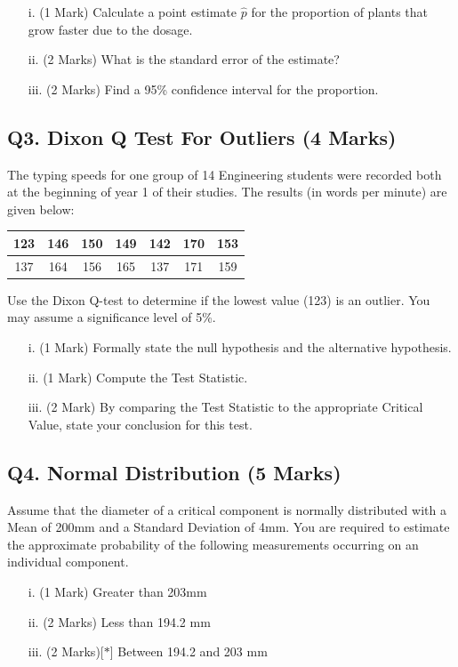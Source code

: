 \documentclass[a4paper,12pt]{article}
\begin{document}
\begin{itemize}
	\item[i.] (1 Mark) Calculate a point estimate $\hat{p}$ for the proportion of plants that grow faster due to the dosage. 									 
	\item[ii.] (2 Marks)  What is the standard error of the estimate? 			
	\item[iii.] (2 Marks) Find a 95\% confidence interval for the proportion. 					
\end{itemize}


\subsection*{Q3. Dixon Q Test For Outliers (4 Marks)}

The typing speeds for one group of 14 Engineering students were recorded both at the beginning of year 1 of their studies. The results (in words per minute) are given below:

\begin{center}
	\begin{tabular}{|c|c|c|c|c|c|c|}
		\hline
		123 & 146 & 150 &149 &142 &170& 153\\ \hline
		137 & 164 & 156& 165& 137& 171& 159
		\\ \hline
	\end{tabular}
\end{center}
Use the Dixon Q-test to determine if the lowest value (123) is an outlier. You may assume a significance level of 5\%.

\begin{itemize}
	\item[i.] (1 Mark) Formally state the null hypothesis and the alternative hypothesis.
	\item[ii.] (1 Mark) Compute the Test Statistic.
	\item[iii.] (2 Mark) By comparing the Test Statistic to the appropriate Critical Value, state your conclusion for this test.
\end{itemize}
\newpage
\subsection*{Q4. Normal Distribution (5 Marks)} %
Assume that the diameter of a critical component is normally distributed with a Mean of 200mm and a Standard Deviation of 4mm. You are required  to estimate the approximate probability of the following measurements occurring on an individual component.
\begin{itemize}
	\item [i.](1 Mark)	Greater than 203mm
	\item [ii.](2 Marks) Less than 194.2 mm
	\item [iii.](2 Marks)[$\ast$] Between 194.2 and 203 mm
\end{itemize}
\bigskip
\end{document}
